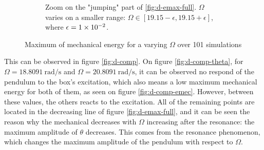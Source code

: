 \documentclass[a4paper,12pt,twoside]{article}
\begin{document}
\begin{figure}[h]
\begin{subfigure}[t]{0.45\textwidth}
		\caption{Zoom on the "jumping" part of \ref{fig:d-emax-full}. $\Omega$ varies on a smaller range: $\Omega\in\left[\num{19.15} - \epsilon, \num{19.15} + \epsilon\right]$, where $\epsilon = \num{1d-2}$.}
		\label{fig:d-emax-close}
	\end{subfigure}
	\caption{Maximum of mechanical energy for a varying $\Omega$ over 101 simulations}
	\label{fig:d-emax}
\end{figure}

This can be observed in figure \ref{fig:d-comp}.
On figure \ref{fig:d-comp-theta}, for $\Omega=\SI{18.8091}{\radian\per\s}$ and $\Omega=\SI{20.8091}{\radian\per\s}$, it can be observed no respond of the pendulum to the box's excitation, which also means a low maximum mechanical energy for both of them, as seen on figure \ref{fig:d-comp-emec}.
However, between these values, the others reacts to the excitation.
All of the remaining points are located in the decreasing line of figure \ref{fig:d-emax-full}, and it can be seen the reason why the mechanical decreases with $\Omega$ increasing after the resonance: the maximum amplitude of $\theta$ decreases.
This comes from the resonance phenomenon, which changes the maximum amplitude of the pendulum with respect to $\Omega$.\\
\end{document}
